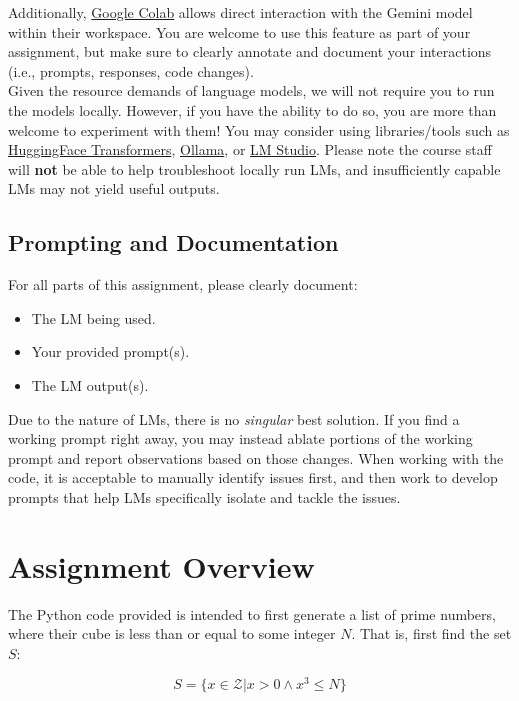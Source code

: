 \documentclass[a4 paper]{article}
\numberwithin{equation}{section}
\begin{document}
Additionally, \href{https://colab.research.google.com/}{Google Colab} allows direct interaction with the Gemini model within their workspace.
You are welcome to use this feature as part of your assignment, but make sure to clearly annotate and document your interactions (i.e., prompts, responses, code changes).\\

Given the resource demands of language models, we will not require you to run the models locally.
However, if you have the ability to do so, you are more than welcome to experiment with them!
You may consider using libraries/tools such as \href{https://huggingface.co/docs/transformers/en/llm_tutorial}{HuggingFace Transformers}, \href{https://ollama.com/}{Ollama}, or \href{https://lmstudio.ai/.}{LM Studio}.
Please note the course staff will \textbf{not} be able to help troubleshoot locally run LMs, and insufficiently capable LMs may not yield useful outputs.

\subsection*{Prompting and Documentation}

For all parts of this assignment, please clearly document:
\begin{itemize}
    \item The LM being used.
    \item Your provided prompt(s).
    \item The LM output(s).
\end{itemize}

Due to the nature of LMs, there is no \textit{singular} best solution.
If you find a working prompt right away, you may instead ablate portions of the working prompt and report observations based on those changes.
When working with the code, it is acceptable to manually identify issues first, and then work to develop prompts that help LMs specifically isolate and tackle the issues.

\newpage
\section*{Assignment Overview}
\label{sec:ip_ai}
The Python code provided is intended to first generate a list of prime numbers, where their cube is less than or equal to some integer $N$. 
That is, first find the set $S$:

\[
S = \{x \in \mathcal{Z} | x>0 \wedge x^3 \leq N\}
\]
\end{document}
